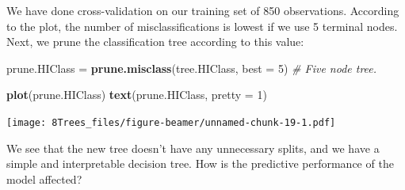 \documentclass[10pt,ignorenonframetext,]{beamer}
\newenvironment{Shaded}{\begin{snugshade}}{\end{snugshade}}
\newcommand{\KeywordTok}[1]{\textcolor[rgb]{0.13,0.29,0.53}{\textbf{#1}}}
\newcommand{\DataTypeTok}[1]{\textcolor[rgb]{0.13,0.29,0.53}{#1}}
\newcommand{\DecValTok}[1]{\textcolor[rgb]{0.00,0.00,0.81}{#1}}
\newcommand{\StringTok}[1]{\textcolor[rgb]{0.31,0.60,0.02}{#1}}
\newcommand{\CommentTok}[1]{\textcolor[rgb]{0.56,0.35,0.01}{\textit{#1}}}
\newcommand{\NormalTok}[1]{#1}
\begin{document}
\begin{frame}[fragile]

We have done cross-validation on our training set of 850 observations.
According to the plot, the number of misclassifications is lowest if we
use 5 terminal nodes. Next, we prune the classification tree according
to this value:

\begin{Shaded}
\begin{Highlighting}[]
\NormalTok{prune.HIClass =}\StringTok{ }\KeywordTok{prune.misclass}\NormalTok{(tree.HIClass, }\DataTypeTok{best =} \DecValTok{5}\NormalTok{)}
\CommentTok{# Five node tree.}
\end{Highlighting}
\end{Shaded}

\end{frame}

\begin{frame}[fragile]

\begin{Shaded}
\begin{Highlighting}[]
\KeywordTok{plot}\NormalTok{(prune.HIClass)}
\KeywordTok{text}\NormalTok{(prune.HIClass, }\DataTypeTok{pretty =} \DecValTok{1}\NormalTok{)}
\end{Highlighting}
\end{Shaded}

\texttt{[image: 8Trees\_files/figure-beamer/unnamed-chunk-19-1.pdf]}

We see that the new tree doesn't have any unnecessary splits, and we
have a simple and interpretable decision tree. How is the predictive
performance of the model affected?

\end{frame}
\end{document}
